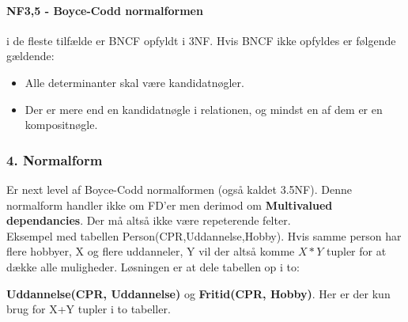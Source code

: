 \paragraph{NF3,5 - Boyce-Codd normalformen} i de fleste tilfælde er BNCF opfyldt i 3NF. Hvis BNCF ikke opfyldes er følgende gældende:
	
\begin{itemize}
	\item Alle determinanter skal være kandidatnøgler.
	\item Der er mere end en kandidatnøgle i relationen, og mindst en af dem er en kompositnøgle.
\end{itemize}
	
\subsubsection{4. Normalform}
Er next level af Boyce-Codd normalformen (også kaldet 3.5NF). Denne normalform handler ikke om FD'er men derimod om \textbf{Multivalued dependancies}. Der må altså ikke være repeterende felter.\\

Eksempel med tabellen Person(CPR,Uddannelse,Hobby). Hvis samme person har flere hobbyer, X og flere uddanneler, Y vil der altså komme $X*Y$ tupler for at dække alle muligheder. Løsningen er at dele tabellen op i to: 

\textbf{Uddannelse(CPR, Uddannelse)} og \textbf{Fritid(CPR, Hobby)}. Her er der kun brug for X+Y tupler i to tabeller.

